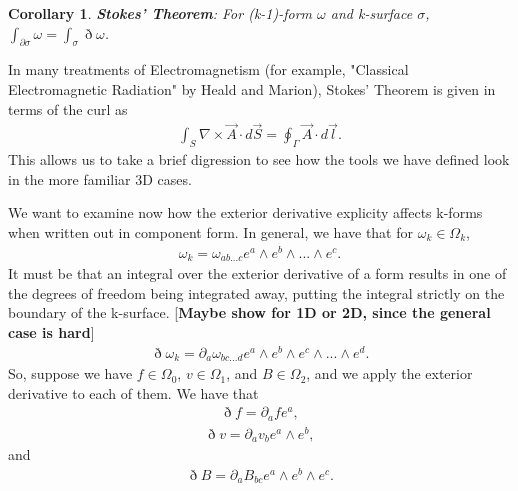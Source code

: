 \documentclass{book}
\newtheorem{coro}[equation]{Corollary}
\begin{document}
\begin{coro}
	\textbf{Stokes' Theorem}: For (k-1)-form $\omega$ and k-surface $\sigma$, $\int_{\partial \sigma}\omega = \int_{\sigma}\eth\omega$. 
\end{coro}

In many treatments of Electromagnetism (for example, "Classical Electromagnetic Radiation" by Heald and Marion), Stokes' Theorem is given in terms of the curl as \begin{gather}\int_S \nabla \times \vec{A} \cdot d\vec{S} = \oint_{\Gamma} \vec{A} \cdot d\vec{l}.\end{gather} This allows us to take a brief digression to see how the tools we have defined look in the more familiar 3D cases. 

We want to examine now how the exterior derivative explicity affects k-forms when written out in component form. In general, we have that for $\omega_k \in \Omega_k$, \begin{gather}\omega_k = \omega_{ab...c}e^a\wedge e^b \wedge ... \wedge e^c.\end{gather} It must be that an integral over the exterior derivative of a form results in one of the degrees of freedom being integrated away, putting the integral strictly on the boundary of the k-surface. [\textbf{Maybe show for 1D or 2D, since the general case is hard}]\begin{gather} \eth \omega_k = \partial_a\omega_{bc...d}e^a\wedge e^b\wedge e^c\wedge ... \wedge e^d.\end{gather} So, suppose we have $f \in \Omega_0$, $v \in \Omega_1$, and $B \in \Omega_2$, and we apply the exterior derivative to each of them. We have that \begin{gather}\eth f = \partial_a f e^a,\end{gather} \begin{gather}\eth v = \partial_a v_b e^a \wedge e^b,\end{gather} and \begin{gather}\eth B = \partial_a B_{bc} e^a\wedge e^b \wedge e^c.\end{gather} 
\end{document}
